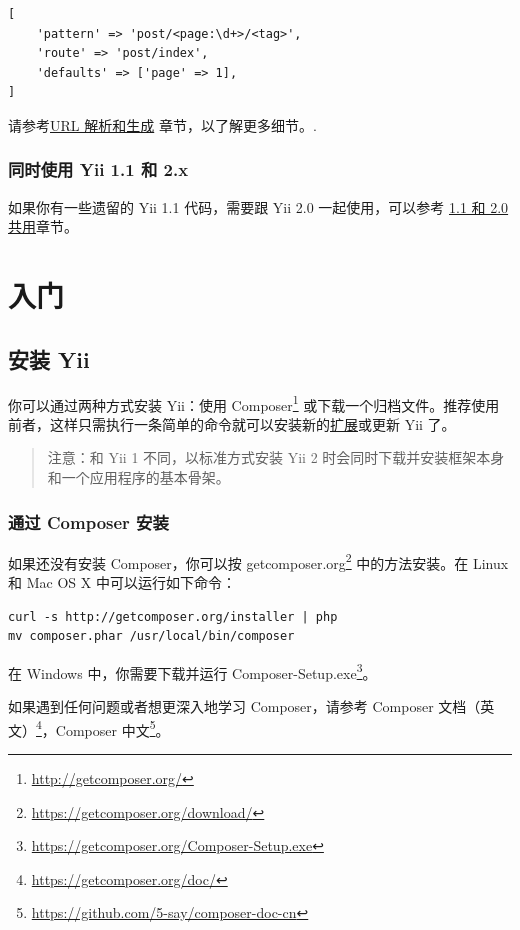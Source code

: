 \lstset{language=php}\begin{lstlisting}
[
    'pattern' => 'post/<page:\d+>/<tag>',
    'route' => 'post/index',
    'defaults' => ['page' => 1],
]
\end{lstlisting}
请参考\hyperref[runtime-url-handling.md]{URL 解析和生成} 章节，以了解更多细节。.

\subsection{同时使用 Yii 1.1 和 2.x}
如果你有一些遗留的 Yii 1.1 代码，需要跟 Yii 2.0 一起使用，可以参考 \hyperref[tutorial-yii-integration.md]{1.1 和 2.0 共用}章节。



\chapter{入门}
\label{start-installation.md}\section{安装 Yii}
你可以通过两种方式安装 Yii：使用 Composer\footnote{\url{http://getcomposer.org/}} 或下载一个归档文件。推荐使用前者，这样只需执行一条简单的命令就可以安装新的\hyperref[structure-extensions.md]{扩展}或更新 Yii 了。

\begin{quote}注意：和 Yii 1 不同，以标准方式安装 Yii 2 时会同时下载并安装框架本身和一个应用程序的基本骨架。

\end{quote}
\subsection{通过 Composer 安装 \label{start-installation.md::installing-via-composer}}
如果还没有安装 Composer，你可以按 getcomposer.org\footnote{\url{https://getcomposer.org/download/}} 中的方法安装。在 Linux 和 Mac OS X 中可以运行如下命令：

\begin{lstlisting}
curl -s http://getcomposer.org/installer | php
mv composer.phar /usr/local/bin/composer
\end{lstlisting}
在 Windows 中，你需要下载并运行 Composer-Setup.exe\footnote{\url{https://getcomposer.org/Composer-Setup.exe}}。

如果遇到任何问题或者想更深入地学习 Composer，请参考 Composer 文档（英文）\footnote{\url{https://getcomposer.org/doc/}}，Composer 中文\footnote{\url{https://github.com/5-say/composer-doc-cn}}。

